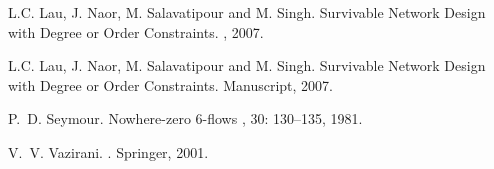 \documentclass[11pt]{article}
\begin{document}
\begin{thebibliography}{99}
L.C. Lau, J. Naor, M. Salavatipour and M. Singh.
\newblock Survivable Network Design with Degree or Order Constraints.
, 2007.

L.C. Lau, J. Naor, M. Salavatipour and M. Singh.
\newblock Survivable Network Design with Degree or Order Constraints.
\newblock Manuscript, 2007.


P.~D. Seymour.
\newblock Nowhere-zero 6-flows
, 30: 130--135, 1981.

V.~V. Vazirani.
.
\newblock Springer, 2001.

\end{thebibliography}
\end{document}
